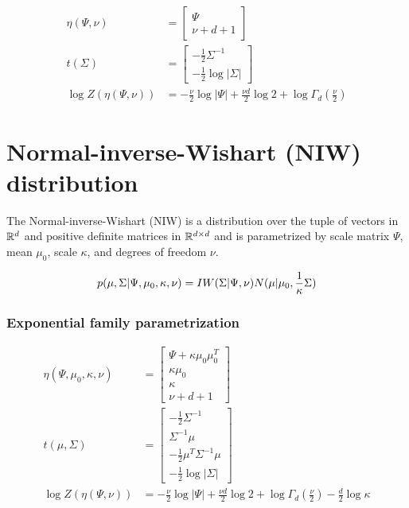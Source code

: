\begin{align*}
    \eta(\Psi, \nu) &= \begin{bmatrix}\Psi \\ \nu + d + 1\end{bmatrix} \\
    t(\Sigma) &= \begin{bmatrix}-\frac{1}{2}\Sigma^{-1} \\ -\frac{1}{2}\log |\Sigma|\end{bmatrix} \\
    \log Z(\eta(\Psi, \nu)) &= -\frac{\nu}{2}\log |\Psi| + \frac{\nu d}{2}\log 2 + \log \Gamma_d\left(\frac{\nu}{2}\right)
\end{align*}

\section{Normal-inverse-Wishart (NIW) distribution}
\label{sec:stats-niw}

The Normal-inverse-Wishart (NIW) is a
distribution over the tuple of vectors in $\mathbb{R}^d$ and 
positive definite matrices in $\mathbb{R}^{d \times d}$
and is parametrized by
scale matrix $\Psi$,
mean $\mu_0$,
scale $\kappa$,
and degrees of freedom $\nu$.

\begin{align}
        p(\mu, \Sigma | \Psi, \mu_0, \kappa, \nu) &= IW(\Sigma|\Psi,\nu)N(\mu|\mu_0,\frac{1}{\kappa}\Sigma) \\
\end{align}

\subsubsection*{Exponential family parametrization}
\begin{align*}
    \eta(\Psi, \mu_0, \kappa, \nu) &= \begin{bmatrix}\Psi + \kappa\mu_0\mu_0^T\\\kappa \mu_0\\\kappa\\\nu + d + 1\end{bmatrix} \\
    t(\mu, \Sigma) &= \begin{bmatrix}-\frac{1}{2}\Sigma^{-1}\\\Sigma^{-1}\mu\\-\frac{1}{2}\mu^T\Sigma^{-1}\mu\\-\frac{1}{2}\log|\Sigma|\end{bmatrix} \\
    \log Z(\eta(\Psi, \nu)) &= -\frac{\nu}{2}\log |\Psi| + \frac{\nu d}{2}\log 2 + \log \Gamma_d\left(\frac{\nu}{2}\right) - \frac{d}{2} \log \kappa
\end{align*}


